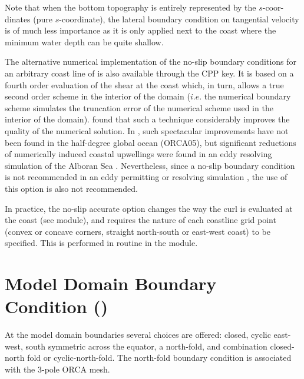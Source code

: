 Note that when the bottom topography is entirely represented by the $s$-coor-dinates 
(pure $s$-coordinate), the lateral boundary condition on tangential velocity is of much 
less importance as it is only applied next to the coast where the minimum water depth 
can be quite shallow.

The alternative numerical implementation of the no-slip boundary conditions for an 
arbitrary coast line of \citet{Shchepetkin1996} is also available through the 
 CPP key. It is based on a fourth order evaluation of the shear at the 
coast which, in turn, allows a true second order scheme in the interior of the domain 
($i.e.$ the numerical boundary scheme simulates the truncation error of the numerical 
scheme used in the interior of the domain). \citet{Shchepetkin1996} found that such a 
technique considerably improves the quality of the numerical solution. In \NEMO, such 
spectacular improvements have not been found in the half-degree global ocean 
(ORCA05), but significant reductions of numerically induced coastal upwellings were 
found in an eddy resolving simulation of the Alboran Sea \citep{Olivier_PhD01}. 
Nevertheless, since a no-slip boundary condition is not recommended in an eddy 
permitting or resolving simulation \citep{Penduff_al_OS07}, the use of this option is also 
not recommended.

In practice, the no-slip accurate option changes the way the curl is evaluated at the 
coast (see  module), and requires the nature of each coastline grid point 
(convex or concave corners, straight north-south or east-west coast) to be specified.  
This is performed in routine  in the  module.

\section{Model Domain Boundary Condition ()}
\label{LBC_jperio}

At the model domain boundaries several choices are offered: closed, cyclic east-west, 
south symmetric across the equator, a north-fold, and combination closed-north fold 
or cyclic-north-fold. The north-fold boundary condition is associated with the 3-pole ORCA mesh. 


